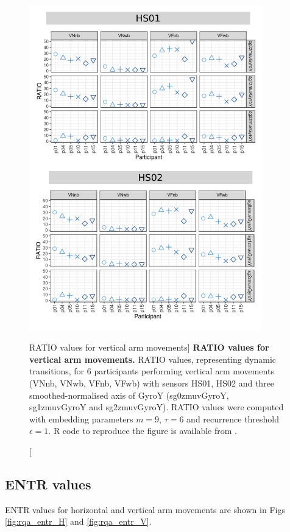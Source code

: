 \begin{figure}
\centering
\includegraphics[width=0.9\textwidth]{rqa_ratio_V_w500}
    \caption
	[RATIO values for vertical arm movements]{
	{\bf RATIO values for vertical arm movements.}	
	RATIO values, representing dynamic transitions, 
	for 6 participants performing vertical arm movements 
	(VNnb, VNwb, VFnb, VFwb)
	with sensors HS01, HS02 and three smoothed-normalised axis 
	of GyroY (sg0zmuvGyroY, sg1zmuvGyroY and sg2zmuvGyroY).
	RATIO values were computed with 
	embedding parameters $m=9$, $\tau=6$ and recurrence threshold
	$\epsilon=1$.
	R code to reproduce the figure is available from \cite{hwum2018}.
        }
    \label{fig:rqa_ratio_V}
\end{figure}



\newpage
\subsection{ENTR values}
ENTR values for horizontal and vertical arm movements are shown 
in Figs \ref{fig:rqa_entr_H} and \ref{fig:rqa_entr_V}.

